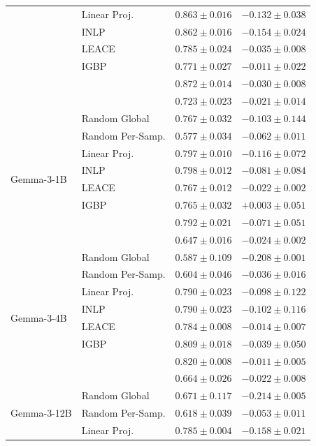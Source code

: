 \begin{longtable}{ll rr}
   & Linear Proj. & $0.863{\pm}0.016$ & $-0.132{\pm}0.038$ \\
   & INLP & $0.862{\pm}0.016$ & $-0.154{\pm}0.024$ \\
   & LEACE & $0.785{\pm}0.024$ & $-0.035{\pm}0.008$ \\
   & IGBP & $0.771{\pm}0.027$ & $-0.011{\pm}0.022$ \\
   & \AmbGCE{} & $0.872{\pm}0.014$ & $-0.030{\pm}0.008$ \\
   & \TanGCE{} & \textbf{$0.723{\pm}0.023$} & $-0.021{\pm}0.014$ \\
  \midrule
  \multirow{8}{*}{Gemma-3-1B} & Random Global & $0.767{\pm}0.032$ & $-0.103{\pm}0.144$ \\
   & Random Per-Samp. & $0.577{\pm}0.034$ & $-0.062{\pm}0.011$ \\
   & Linear Proj. & $0.797{\pm}0.010$ & $-0.116{\pm}0.072$ \\
   & INLP & $0.798{\pm}0.012$ & $-0.081{\pm}0.084$ \\
   & LEACE & $0.767{\pm}0.012$ & $-0.022{\pm}0.002$ \\
   & IGBP & $0.765{\pm}0.032$ & $+0.003{\pm}0.051$ \\
   & \AmbGCE{} & $0.792{\pm}0.021$ & $-0.071{\pm}0.051$ \\
   & \TanGCE{} & \textbf{$0.647{\pm}0.016$} & $-0.024{\pm}0.002$ \\
  \midrule
  \multirow{8}{*}{Gemma-3-4B} & Random Global & \textbf{$0.587{\pm}0.109$} & $-0.208{\pm}0.001$ \\
   & Random Per-Samp. & $0.604{\pm}0.046$ & $-0.036{\pm}0.016$ \\
   & Linear Proj. & $0.790{\pm}0.023$ & $-0.098{\pm}0.122$ \\
   & INLP & $0.790{\pm}0.023$ & $-0.102{\pm}0.116$ \\
   & LEACE & $0.784{\pm}0.008$ & $-0.014{\pm}0.007$ \\
   & IGBP & $0.809{\pm}0.018$ & $-0.039{\pm}0.050$ \\
   & \AmbGCE{} & $0.820{\pm}0.008$ & $-0.011{\pm}0.005$ \\
   & \TanGCE{} & \textbf{$0.664{\pm}0.026$} & $-0.022{\pm}0.008$ \\
  \midrule
  \multirow{8}{*}{Gemma-3-12B} & Random Global & $0.671{\pm}0.117$ & $-0.214{\pm}0.005$ \\
   & Random Per-Samp. & $0.618{\pm}0.039$ & $-0.053{\pm}0.011$ \\
   & Linear Proj. & $0.785{\pm}0.004$ & $-0.158{\pm}0.021$ \\

\end{longtable}
